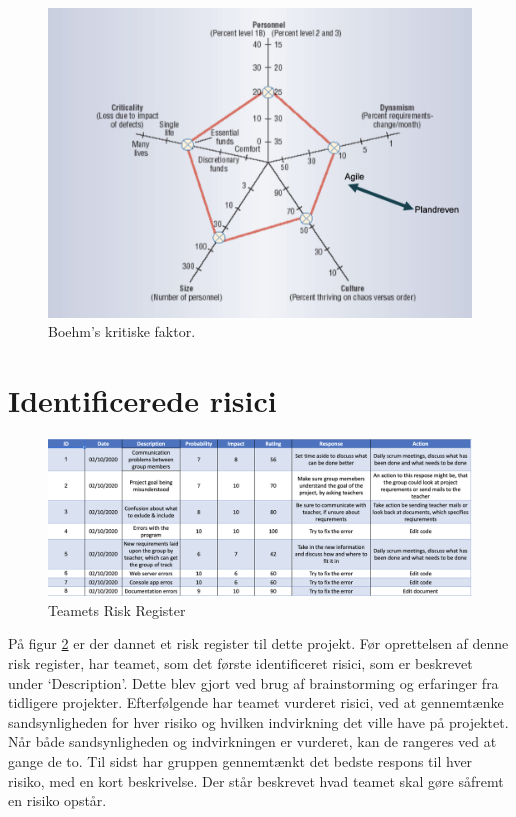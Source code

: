 \begin{figure}
    \includegraphics[width=\linewidth]{figures/Boehm.png}
    \caption{Boehm's kritiske faktor.}
    \label{fig:Boehm}
\end{figure}

\section{Identificerede risici}\label{sec:identified_risks}
\begin{figure}
    \includegraphics[width=\linewidth]{figures/RiskRegister.png}
    \caption{Teamets Risk Register}
    \label{fig:Risk}
\end{figure}
På figur \ref{fig:Risk} er der dannet et risk register til dette projekt. Før oprettelsen af denne risk register, har teamet, som det første identificeret risici, som er beskrevet under ‘Description’. Dette blev gjort ved brug af brainstorming og erfaringer fra tidligere projekter. Efterfølgende har teamet vurderet risici, ved at gennemtænke sandsynligheden for hver risiko og hvilken indvirkning det ville have på projektet. Når både sandsynligheden og indvirkningen er vurderet, kan de rangeres ved at gange de to. Til sidst har gruppen gennemtænkt det bedste respons til hver risiko, med en kort beskrivelse. Der står beskrevet hvad teamet skal gøre såfremt en risiko opstår. 

